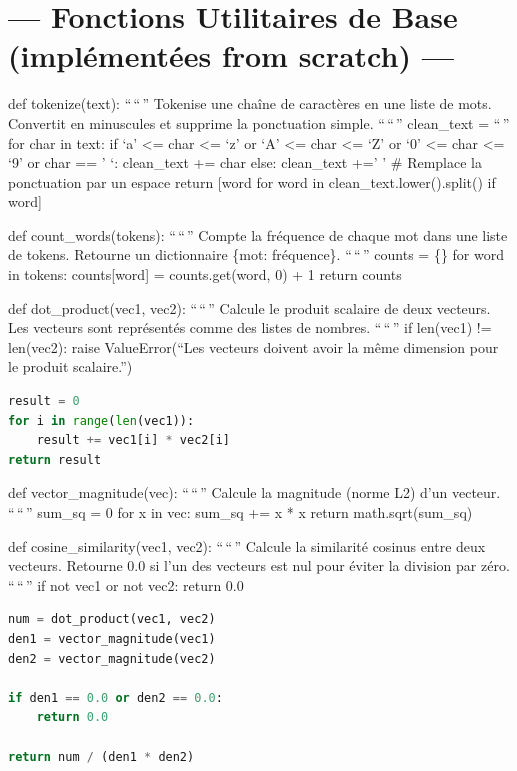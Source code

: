 \documentclass[11pt,a4paper]{report}
\begin{document}
\hypertarget{fonctions-utilitaires-de-base-impluxe9mentuxe9es-from-scratch}{%
\section{--- Fonctions Utilitaires de Base (implémentées from scratch)
---}\label{fonctions-utilitaires-de-base-impluxe9mentuxe9es-from-scratch}}

def tokenize(text): ``\,``\,'' Tokenise une chaîne de caractères en une
liste de mots. Convertit en minuscules et supprime la ponctuation
simple. ``\,``\,'' clean\_text = ``\,'' for char in text: if `a'
\textless= char \textless= `z' or `A' \textless= char \textless= `Z' or
`0' \textless= char \textless= `9' or char == ' `: clean\_text += char
else: clean\_text +=' ' \# Remplace la ponctuation par un espace return
{[}word for word in clean\_text.lower().split() if word{]}

def count\_words(tokens): ``\,``\,'' Compte la fréquence de chaque mot
dans une liste de tokens. Retourne un dictionnaire \{mot: fréquence\}.
``\,``\,'' counts = \{\} for word in tokens: counts{[}word{]} =
counts.get(word, 0) + 1 return counts

def dot\_product(vec1, vec2): ``\,``\,'' Calcule le produit scalaire de
deux vecteurs. Les vecteurs sont représentés comme des listes de
nombres. ``\,``\,'' if len(vec1) != len(vec2): raise ValueError(``Les
vecteurs doivent avoir la même dimension pour le produit scalaire.'')

\begin{lstlisting}[language=Python]
result = 0
for i in range(len(vec1)):
    result += vec1[i] * vec2[i]
return result
\end{lstlisting}

def vector\_magnitude(vec): ``\,``\,'' Calcule la magnitude (norme L2)
d'un vecteur. ``\,``\,'' sum\_sq = 0 for x in vec: sum\_sq += x * x
return math.sqrt(sum\_sq)

def cosine\_similarity(vec1, vec2): ``\,``\,'' Calcule la similarité
cosinus entre deux vecteurs. Retourne 0.0 si l'un des vecteurs est nul
pour éviter la division par zéro. ``\,``\,'' if not vec1 or not vec2:
return 0.0

\begin{lstlisting}[language=Python]
num = dot_product(vec1, vec2)
den1 = vector_magnitude(vec1)
den2 = vector_magnitude(vec2)

if den1 == 0.0 or den2 == 0.0:
    return 0.0

return num / (den1 * den2)
\end{lstlisting}
\end{document}
